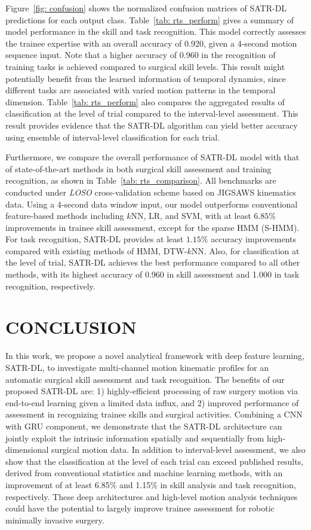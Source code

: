 \documentclass[letterpaper, 10 pt, conference, twoside]{IEEEtran}
\begin{document}
Figure~\ref{fig: confusion} shows the normalized confusion matrices of SATR-DL predictions for each output class. Table~\ref{tab: rts_perform} gives a summary of model performance in the skill and task recognition. 
This model correctly assesses the trainee expertise with an overall accuracy of 0.920, given a 4-second motion sequence input. 
Note that a higher accuracy of 0.960 in the recognition of training tasks is achieved compared to surgical skill levels. This result might potentially benefit from the learned information of temporal dynamics, since different tasks are associated with varied motion patterns in the temporal dimension.
Table~\ref{tab: rts_perform} also compares the aggregated results of classification at the level of trial compared to the interval-level assessment. This result provides evidence that the SATR-DL algorithm can yield better accuracy using ensemble of interval-level classification for each trial.  

Furthermore, we compare the overall performance of SATR-DL model with that of state-of-the-art methods in both surgical skill assessment and training recognition, as shown in Table~\ref{tab: rts_comparison}. All benchmarks are conducted under \textit{LOSO} cross-validation scheme based on JIGSAWS kinematics data. Using a 4-second data window input, our model outperforms conventional feature-based methods including $k$NN, LR, and SVM, with at least $6.85\%$ improvements in trainee skill assessment, except for the sparse HMM (S-HMM). For task recognition, SATR-DL provides at least $1.15\%$ accuracy improvements compared with existing methods of HMM, DTW-$k$NN. Also, for classification at the level of trial, SATR-DL achieves the best performance compared to all other methods, with its highest accuracy of 0.960 in skill assessment and 1.000 in task recognition, respectively. 

\section{CONCLUSION}
In this work, we propose a novel analytical framework with deep feature learning, SATR-DL, to investigate multi-channel motion kinematic profiles for an automatic surgical skill assessment and task recognition. The benefits of our proposed SATR-DL are: 1) highly-efficient processing of raw surgery motion via end-to-end learning given a limited data influx, and 2) improved performance of assessment in recognizing trainee skills and surgical activities.
Combining a CNN with GRU component, we demonstrate that the SATR-DL architecture can jointly exploit the intrinsic information spatially and sequentially from high-dimensional surgical motion data. In addition to interval-level assessment, we also show that the classification at the level of each trial can exceed published results, derived from conventional statistics and machine learning methods, with an improvement of at least 6.85\% and 1.15\% in skill analysis and task recognition, respectively.
These deep architectures and high-level motion analysis techniques could have the potential to largely improve trainee assessment for robotic minimally invasive surgery. 
\end{document}

